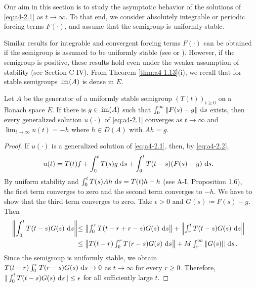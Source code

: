 

Our aim in this section is to study the asymptotic behavior of the solutions of \eqref{eq:a4-2.1} as $t \to \infty$. 
To that end, we consider absolutely integrable or periodic forcing terms $F(\cdot)$, and assume that the semigroup
is uniformly stable.



Similar results for integrable and convergent forcing terms $F(\cdot)$ can
be obtained if the semigroup is assumed to be uniformly  
stable (see \citet[p.119]{pazy:1983} or \citet{neubrander:1985b}). 
However, if the
semigroup is positive, these results hold even under the weaker assumption of stability (see Section C-IV).
From Theorem \ref{thm:a4-1.13}(i), we recall that for stable
semigroups $\mathop{}\mathrm{im}(A)$ is dense in $E$.

\begin{theorem}\label{thm:a4-2.1}
Let $A$ be the generator of a uniformly stable semigroup
$(T(t))_{t \geq 0}$ on a Banach space $E$. 
If there is $g \in \mathop{}\mathrm{im}(A)$ such that
$\int_{0}^{\infty} \|F(s) - g\| \,\mathop{}\!\mathrm{d}{s}$ exists, then every generalized solution $u(\cdot)$ of
\eqref{eq:a4-2.1} converges as $t \to \infty$ and $\lim_{t \to \infty} u(t) = -h$ where $h \in D(A)$ with
$Ah = g$.
\end{theorem}

\begin{proof}
If $u(\cdot)$ is a generalized solution of \eqref{eq:a4-2.1}, then, by \eqref{eq:a4-2.2},
\[
u(t) = T(t)f + \int_{0}^{t} T(s)g \,\mathop{}\!\mathrm{d}{s} + \int_{0}^{t} T(t-s)(F(s)-g) \,\mathop{}\!\mathrm{d}{s}.
\]
By uniform
stability and $\int_0^t T(s)Ah\,\mathop{}\!\mathrm{d}{s} = T(t)h - h$ (see A-I, Proposition 1.6), the first term converges to zero
and the second term converges to $-h$. 
We have to show that the
third term converges to zero. 
Take $\epsilon > 0$ and $G(s) \coloneqq F(s)-g$. 
Then
\begin{align*}
\left\|\int_{0}^{t} T(t-s)G(s) \,\mathop{}\!\mathrm{d}{s}\right\| & 
\textstyle{\leq \left\|\int_{0}^{r} T(t-r+r-s)G(s) \,\mathop{}\!\mathrm{d}{s}\right\| + \left\|\int_{r}^{t} T(t-s)G(s) \,\mathop{}\!\mathrm{d}{s}\right\|}\\
& 
\textstyle{\leq \left\|T(t-r)\int_{0}^{r} T(r-s)G(s) \,\mathop{}\!\mathrm{d}{s}\right\| + M \int_{r}^{\infty} \|G(s)\| \,\mathop{}\!\mathrm{d}{s}\,.}
\end{align*}
Since the semigroup is uniformly stable, we obtain
$T(t-r)\int_{0}^{r} T(r-s)G(s) \,\mathop{}\!\mathrm{d}{s} \to 0$ as $t \to \infty$ for every $r \geq 0$.
Therefore, $\|\int_{0}^{t} T(t-s)G(s) \,\mathop{}\!\mathrm{d}{s}\| \leq \epsilon$ for all sufficiently large $t$.
\end{proof}


